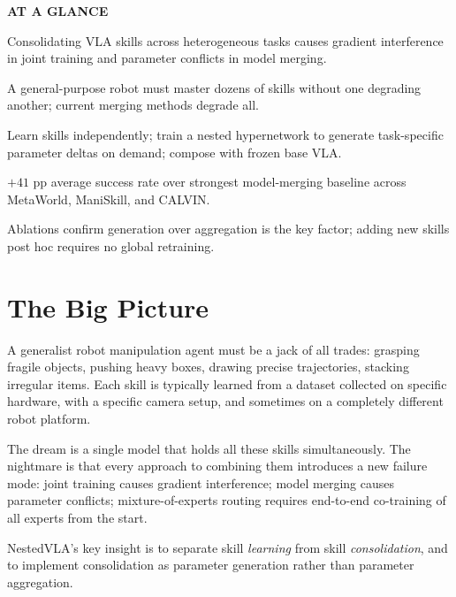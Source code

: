\documentclass[10pt,twocolumn]{article}
\begin{document}
\begin{mdframed}[backgroundcolor=boxgray,linecolor=rulered,linewidth=1pt,
    innerleftmargin=6pt,innerrightmargin=6pt,
    innertopmargin=6pt,innerbottommargin=6pt]
\textbf{\small AT A GLANCE}\par\vspace{4pt}
\begin{description}[leftmargin=0pt,labelsep=4pt,itemsep=2pt,parsep=0pt,
    font=\small\bfseries]
  \item[Problem:] Consolidating VLA skills across heterogeneous tasks
    causes gradient interference in joint training and parameter conflicts
    in model merging.
  \item[Why it matters:] A general-purpose robot must master dozens of
    skills without one degrading another; current merging methods degrade
    all.
  \item[Method:] Learn skills independently; train a nested hypernetwork
    to generate task-specific parameter deltas on demand; compose with
    frozen base VLA.
  \item[Result:] $+41$ pp average success rate over strongest model-merging
    baseline across MetaWorld, ManiSkill, and CALVIN.
  \item[Evidence:] Ablations confirm generation over aggregation is the
    key factor; adding new skills post hoc requires no global retraining.
\end{description}
\end{mdframed}

\section{The Big Picture}

A generalist robot manipulation agent must be a jack of all trades:
grasping fragile objects, pushing heavy boxes, drawing precise trajectories,
stacking irregular items. Each skill is typically learned from a dataset
collected on specific hardware, with a specific camera setup, and sometimes
on a completely different robot platform.

The dream is a single model that holds all these skills simultaneously. The
nightmare is that every approach to combining them introduces a new failure
mode: joint training causes gradient interference; model merging causes
parameter conflicts; mixture-of-experts routing requires end-to-end
co-training of all experts from the start.

NestedVLA's key insight is to separate skill \textit{learning} from skill
\textit{consolidation}, and to implement consolidation as parameter
generation rather than parameter aggregation.
\end{document}
